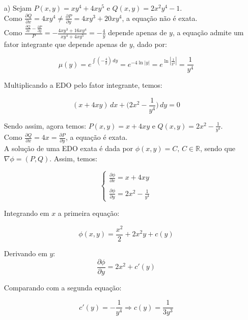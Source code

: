 \documentclass[12pt,a4paper]{article}
\newcommand{\re}{\mathbb{R}}
\begin{document}
\begin{itemize}
    \item[a)] Sejam $P(x,y) = xy^4 + 4xy^5$ e $Q(x,y) = 2x^2 y^4 -1$. \\
    
    Como $\displaystyle\frac{\partial Q}{\partial x} = 4xy^4 \neq \frac{\partial P}{\partial y} = 4xy^3 + 20xy^4$, a equação não é exata. \\
    
    Como $\displaystyle\frac{\frac{\partial Q}{\partial x} - \frac{\partial P}{\partial y}}{P} = - \frac{4xy^3 + 16xy^4}{xy^4 + 4xy^5} = -\frac{4}{y}$ depende apenas de $y$, a equação admite um fator integrante que depende apenas de $y$, dado por:
    
    $$ \mu(y) = e^{\int (-\frac{4}{y}) \, dy} = e^{-4 \ln|y|} =  e^{\ln|\frac{1}{y^4}|} = \frac{1}{y^4} $$
    
    Multiplicando a EDO pelo fator integrante, temos:
    
    $$ (x+4xy)\,dx + \Big(2x^2 - \frac{1}{y^4}\Big)\,dy = 0 $$
    
   Sendo assim, agora temos: $P(x,y) = x+4xy$ e $Q(x,y) = 2x^2 - \displaystyle\frac{1}{y^4}$. \\
   
   Como $\displaystyle\frac{\partial Q}{\partial x} = 4x = \frac{\partial P}{\partial y} $, a equação é exata. \\
   
   A solução de uma EDO exata é dada por $\phi(x,y) = C, \, C \in \re$, sendo que $\nabla\phi = (P,Q)$. Assim, temos:
   
   $$ 
   \begin{cases}
   \displaystyle\frac{\partial \phi}{\partial x} = x+4xy \\
   \\
   \displaystyle\frac{\partial \phi}{\partial y} = 2x^2 - \displaystyle\frac{1}{y^4}
   \end{cases} 
   $$
   
Integrando em $x$ a primeira equação:

$$ \phi (x,y) = \frac{x^2}{2} + 2 x^2 y + c(y) $$

Derivando em $y$:
$$ \displaystyle \frac{ \partial \phi}{\partial y} = 2x^2 + c'(y) $$

Comparando com a segunda equação:

$$ c'(y) = -\frac{1}{y^4} \Rightarrow c(y) = \frac{1}{3 y^3}$$


\end{itemize}
\end{document}
